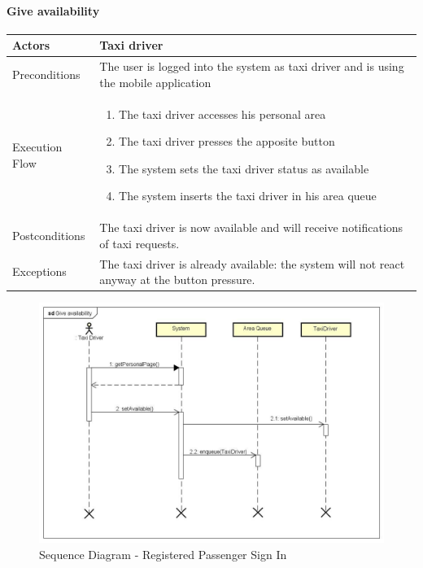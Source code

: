 \paragraph{Give availability}
\begin{center}
	\begin{tabular}{ | l | p{8cm} |}
		\hline Actors & Taxi driver
		\\ \hline
		Preconditions &
		The user is logged into the system as taxi driver and is using the mobile application
		\\ \hline
		Execution Flow &
		\begin{enumerate}
			\item The taxi driver accesses his personal area
			\item The taxi driver presses the apposite button
			\item The system sets the taxi driver status as available
			\item The system inserts the taxi driver in his area queue
		\end{enumerate}
		\\ \hline
		Postconditions & 
		The taxi driver is now available and will receive notifications of taxi requests.
		\\ \hline
		Exceptions &
		The taxi driver is already available: the system will not react anyway at the button
		pressure.
		\\ \hline
	\end{tabular}
\end{center}
\newpage
\begin{landscape}
\begin{figure}[!h]
	\begin{center}			
		\includegraphics[height=\textheight]{../SE2_SD/GiveAvailability}
		\caption{Sequence Diagram - Registered Passenger Sign In}	
	\end{center}
\end{figure}
\end{landscape}
\newpage
